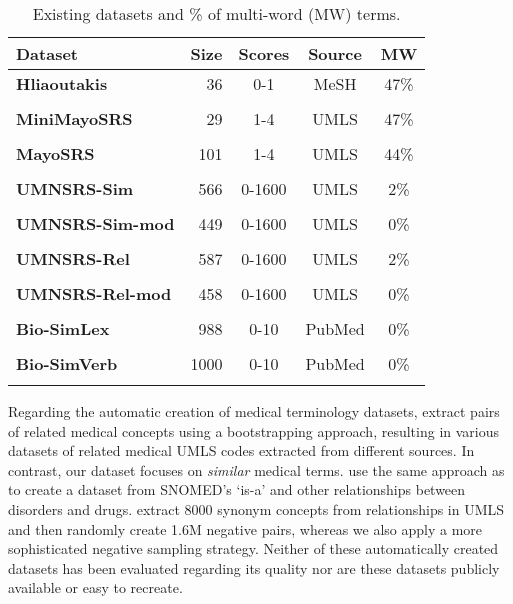 \documentclass[letterpaper]{article} %
\begin{document}
\begin{table}[ht]
    \centering
    \small
    \begin{tabular}{l r c c c}
    \toprule
         \textbf{Dataset} & \textbf{Size} & \textbf{Scores} & \textbf{Source} & \textbf{MW}\\ \midrule
         \textbf{Hliaoutakis} & 36 & 0-1 & MeSH & 47\%\\
          \cite{Hliaoutakis2005} \\
         \textbf{MiniMayoSRS} & 29 & 1-4 & UMLS & 47\%\\
         \cite{PedersenPPC2007} \\
         \textbf{MayoSRS} & 101 & 1-4 & UMLS & 44\%\\
          \cite{PakhomovEtAl2011}\\
         \textbf{UMNSRS-Sim} & 566 & 0-1600 & UMLS & 2\%\\
          \cite{PakhomovEtAl2010}\\
         \textbf{UMNSRS-Sim-mod} & 449 & 0-1600 & UMLS & 0\%\\
          \cite{PakhomovEtAl2016}\\
         \textbf{UMNSRS-Rel} & 587 & 0-1600 & UMLS & 2\% \\
          \cite{PakhomovEtAl2010}\\
         \textbf{UMNSRS-Rel-mod} & 458 & 0-1600 & UMLS & 0\%\\
          \cite{PakhomovEtAl2016}\\
         \textbf{Bio-SimLex} & 988 & 0-10 & PubMed & 0\%\\
          \cite{ChiuPVK2018}\\
         \textbf{Bio-SimVerb} & 1000 & 0-10 & PubMed & 0\%\\
          \cite{ChiuPVK2018}\\
         \bottomrule
    \end{tabular}
    \caption{Existing datasets and \% of multi-word (MW) terms.}
    \label{tab:existing_data}
\end{table}

Regarding the automatic creation of medical terminology datasets, \citeauthor{BeamEtAl2018}  extract pairs of related medical concepts using a bootstrapping approach, resulting in various datasets of related medical UMLS codes extracted from different sources.
In contrast, our dataset focuses on \emph{similar} medical terms.
\citeauthor{AgarwalEtAl2019}  use the same approach as \citeauthor{BeamEtAl2018} to create a dataset from SNOMED's `is-a' and other relationships between disorders and drugs.
\citeauthor{WangCZ2015}  extract 8000 synonym concepts from relationships in UMLS and then randomly create 1.6M negative pairs, whereas
we also apply a more sophisticated negative sampling strategy.
Neither of these automatically created datasets has been evaluated regarding its quality nor are these datasets publicly available or easy to recreate.
\end{document}
